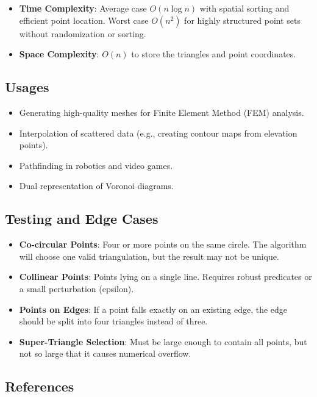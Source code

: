 \begin{itemize}
\item \textbf{Time Complexity}: Average case $O(n \log n)$ with spatial sorting and efficient point location. Worst case $O(n^2)$ for highly structured point sets without randomization or sorting.
\item \textbf{Space Complexity}: $O(n)$ to store the triangles and point coordinates.
\end{itemize}

\subsection{Usages}

\begin{itemize}
\item Generating high-quality meshes for Finite Element Method (FEM) analysis.
\item Interpolation of scattered data (e.g., creating contour maps from elevation points).
\item Pathfinding in robotics and video games.
\item Dual representation of Voronoi diagrams.
\end{itemize}

\subsection{Testing and Edge Cases}

\begin{itemize}
\item \textbf{Co-circular Points}: Four or more points on the same circle. The algorithm will choose one valid triangulation, but the result may not be unique.
\item \textbf{Collinear Points}: Points lying on a single line. Requires robust predicates or a small perturbation (epsilon).
\item \textbf{Points on Edges}: If a point falls exactly on an existing edge, the edge should be split into four triangles instead of three.
\item \textbf{Super-Triangle Selection}: Must be large enough to contain all points, but not so large that it causes numerical overflow.
\end{itemize}

\subsection{References}

